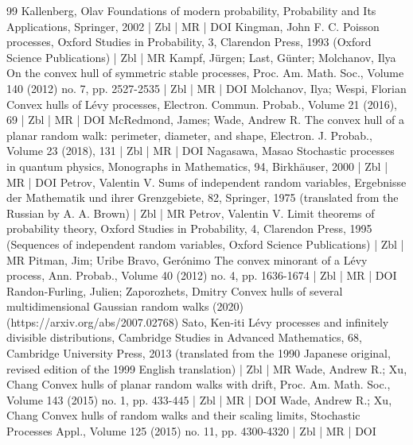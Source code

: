 \begin{thebibliography}{99}
Kallenberg, Olav Foundations of modern probability, Probability and Its Applications, Springer, 2002 | Zbl | MR | DOI
Kingman, John F. C. Poisson processes, Oxford Studies in Probability, 3, Clarendon Press, 1993 (Oxford Science Publications) | Zbl | MR
Kampf, Jürgen; Last, Günter; Molchanov, Ilya On the convex hull of symmetric stable processes, Proc. Am. Math. Soc., Volume 140 (2012) no. 7, pp. 2527-2535 | Zbl | MR | DOI
Molchanov, Ilya; Wespi, Florian Convex hulls of Lévy processes, Electron. Commun. Probab., Volume 21 (2016), 69 | Zbl | MR | DOI
McRedmond, James; Wade, Andrew R. The convex hull of a planar random walk: perimeter, diameter, and shape, Electron. J. Probab., Volume 23 (2018), 131 | Zbl | MR | DOI
Nagasawa, Masao Stochastic processes in quantum physics, Monographs in Mathematics, 94, Birkhäuser, 2000 | Zbl | MR | DOI
Petrov, Valentin V. Sums of independent random variables, Ergebnisse der Mathematik und ihrer Grenzgebiete, 82, Springer, 1975 (translated from the Russian by A. A. Brown) | Zbl | MR
Petrov, Valentin V. Limit theorems of probability theory, Oxford Studies in Probability, 4, Clarendon Press, 1995 (Sequences of independent random variables, Oxford Science Publications) | Zbl | MR
Pitman, Jim; Uribe Bravo, Gerónimo The convex minorant of a Lévy process, Ann. Probab., Volume 40 (2012) no. 4, pp. 1636-1674 | Zbl | MR | DOI
Randon-Furling, Julien; Zaporozhets, Dmitry Convex hulls of several multidimensional Gaussian random walks (2020) (https://arxiv.org/abs/2007.02768)
Sato, Ken-iti Lévy processes and infinitely divisible distributions, Cambridge Studies in Advanced Mathematics, 68, Cambridge University Press, 2013 (translated from the 1990 Japanese original, revised edition of the 1999 English translation) | Zbl | MR
Wade, Andrew R.; Xu, Chang Convex hulls of planar random walks with drift, Proc. Am. Math. Soc., Volume 143 (2015) no. 1, pp. 433-445 | Zbl | MR | DOI
Wade, Andrew R.; Xu, Chang Convex hulls of random walks and their scaling limits, Stochastic Processes Appl., Volume 125 (2015) no. 11, pp. 4300-4320 | Zbl | MR | DOI
\end{thebibliography}

